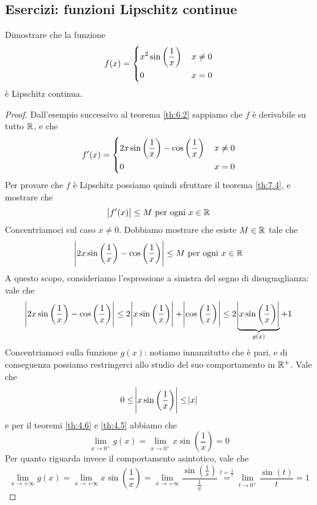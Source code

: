 \subsection{Esercizi: funzioni Lipschitz continue}
\begin{exercise}
    \label{ex:7.3}
    Dimostrare che la funzione
    \[
    f(x) = \begin{dcases}
        x^2\sin\left(\frac{1}{x}\right)\, & x\ne 0\\
        0\, & x=0
    \end{dcases}
    \]
    è Lipschitz continua. 
\end{exercise}
\begin{proof}
    Dall'esempio successivo al teorema \ref{th:6.2} sappiamo che $f$ è derivabile su tutto $\amsbb{R}$, e che 
    \[
    f'(x) = \begin{dcases}
        2x\sin\left(\frac{1}{x}\right)-\cos\left(\frac{1}{x}\right)\, & x\ne 0\\
        0\, & x=0
    \end{dcases}
    \]
    Per provare che $f$ è Lipschitz possiamo quindi sfruttare il teorema \ref{th:7.4}, e mostrare che 
    \[
    \abs{f'(x)}\le M \ \text{per ogni} \ x\in\amsbb{R}
    \]
    Concentriamoci sul caso $x\ne 0$. Dobbiamo mostrare che esiste $M\in\amsbb{R}$ tale che
    \[
    \abs{2x\sin\left(\frac{1}{x}\right)-\cos\left(\frac{1}{x}\right)}\le M \ \text{per ogni} \ x\in \amsbb{R}
    \]
    A questo scopo, consideriamo l'espressione a sinistra del segno di disuguaglianza: vale che
    \[
    \abs{2x\sin\left(\frac{1}{x}\right)-\cos\left(\frac{1}{x}\right)}\le 2\abs{x\sin\left(\frac{1}{x}\right)}+\abs{\cos\left(\frac{1}{x}\right)}\le 2\underbrace{\abs{x\sin\left(\frac{1}{x}\right)}}_{g(x)}+1
    \]
    Concentriamoci sulla funzione $g(x)$: notiamo innanzitutto che è pari, e di conseguenza possiamo restringerci allo studio del suo comportamento in $\amsbb{R}^+$. Vale che
    \[
    0\le \abs{x\sin\left(\frac{1}{x}\right)}\le \abs{x}
    \]
    e per il teoremi \ref{th:4.6} e \ref{th:4.5} abbiamo che
    \begin{equation}
        \label{eq:7.2}
        \lim_{x\to 0^+} g(x) = \lim_{x\to 0^+} x\sin\left(\frac{1}{x}\right) = 0
    \end{equation}
    Per quanto riguarda invece il comportamento asintotico, vale che
    \begin{equation}
        \label{eq:7.3}
        \lim_{x\to +\infty} g(x) = \lim_{x\to +\infty} x \sin\left(\frac{1}{x}\right) = \lim_{x\to +\infty} \frac{\sin\left(\frac{1}{x}\right)}{\frac{1}{x}} \overset{t=\frac{1}{x}}{=}\lim_{t\to 0^+} \frac{\sin(t)}{t} = 1

\end{equation}
\end{proof}
